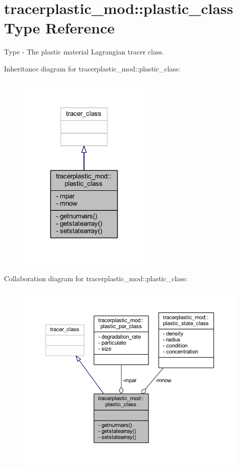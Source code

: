 \hypertarget{structtracerplastic__mod_1_1plastic__class}{}\section{tracerplastic\+\_\+mod\+:\+:plastic\+\_\+class Type Reference}
\label{structtracerplastic__mod_1_1plastic__class}


Type -\/ The plastic material Lagrangian tracer class.  




Inheritance diagram for tracerplastic\+\_\+mod\+:\+:plastic\+\_\+class\+:\nopagebreak
\begin{figure}[H]
\begin{center}
\leavevmode
\includegraphics[width=180pt]{structtracerplastic__mod_1_1plastic__class__inherit__graph}
\end{center}
\end{figure}


Collaboration diagram for tracerplastic\+\_\+mod\+:\+:plastic\+\_\+class\+:\nopagebreak
\begin{figure}[H]
\begin{center}
\leavevmode
\includegraphics[width=350pt]{structtracerplastic__mod_1_1plastic__class__coll__graph}
\end{center}
\end{figure}

